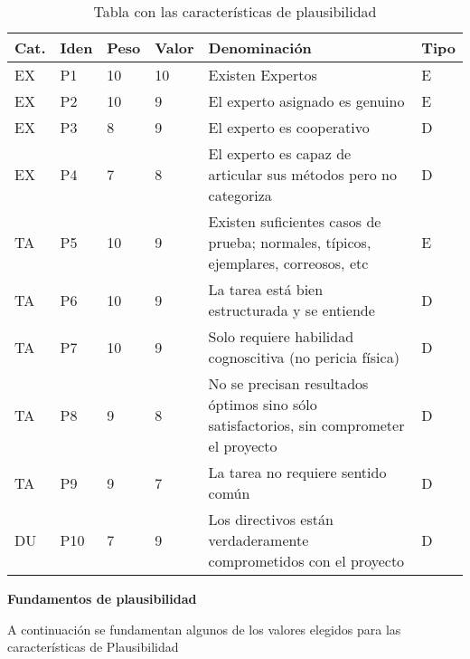 \begin{table}[htb]%
  \centering
  \caption{Tabla con las características de plausibilidad}
  \label{tab:anchura}
  \begin{tabular}{ | l | l | l | l | p{8cm} | l | }
    \hline
    Cat. & Iden & Peso & Valor & Denominación & Tipo \\ \hline
    EX & P1 & 10 & 10 & Existen Expertos & E \\ \hline
    EX & P2 &  10 & 9 & El experto asignado es genuino & E \\ \hline
    EX & P3 & 8 & 9 & El experto es cooperativo & D \\ \hline
    EX & P4 & 7 & 8 & El experto es capaz de articular sus métodos pero no categoriza & D \\ \hline
    TA & P5 & 10 & 9 & Existen suficientes casos de prueba; normales, típicos, ejemplares, correosos, etc & E \\ \hline
    TA & P6 & 10 & 9 & La tarea está bien estructurada y se entiende & D \\ \hline
    TA & P7 & 10 & 9 & Solo requiere habilidad cognoscitiva (no pericia física) & D \\ \hline
    TA & P8 & 9 & 8 & No se precisan resultados óptimos sino sólo satisfactorios, sin comprometer el proyecto & D \\ \hline
    TA & P9 & 9 & 7 & La tarea no requiere sentido común & D \\ \hline
    DU & P10 & 7 & 9 & Los directivos están verdaderamente comprometidos con el proyecto & D \\ \hline
  \end{tabular}
\end{table}

\textbf{Fundamentos de plausibilidad}

A continuación se fundamentan algunos de los valores elegidos para las características de Plausibilidad


